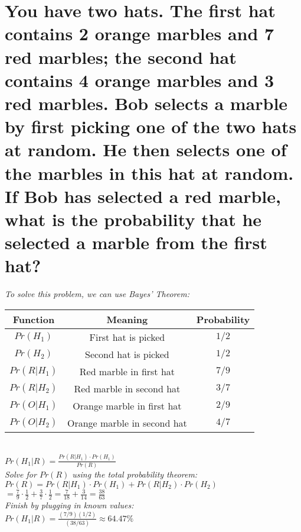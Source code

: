 \documentclass{article}
\begin{document}
\section{You have two hats. The first hat contains 2 orange marbles and 7 red marbles;
    the second hat contains 4 orange marbles and 3 red marbles. Bob selects a marble
    by first picking one of the two hats at random. He then selects one of the marbles in this hat
    at random. If Bob has selected a red marble, what is the probability that he selected a
    marble from the first hat?}
\hspace{1cm}\textit{To solve this problem, we can use Bayes' Theorem:}
\begin{center}
    \begin{tabular}{c|c|c}
        Function & Meaning & Probability \\
        \hline
        $Pr(H_1)$ & First hat is picked & $1/2$ \\
        $Pr(H_2)$ & Second hat is picked & $1/2$ \\
        \hline
        $Pr(R|H_1)$ & Red marble in first hat & $7/9$ \\
        $Pr(R|H_2)$ & Red marble in second hat & $3/7$ \\
        $Pr(O|H_1)$ & Orange marble in first hat & $2/9$ \\
        $Pr(O|H_2)$ & Orange marble in second hat & $4/7$ \\
    \end{tabular} \\
    \vspace{0.25cm}
    $Pr(H_1|R) = \frac{Pr(R|H_1)\cdot Pr(H_1)}{Pr(R)}$ \\
    \vspace{0.25cm}
    \textit{Solve for $Pr(R)$ using the total probability theorem:} \\
    \vspace{0.25cm}
    $Pr(R) = Pr(R|H_1)\cdot Pr(H_1) + Pr(R|H_2)\cdot Pr(H_2)$ \\
    \vspace{0.25cm}
    $ = \frac{7}{9}\cdot \frac{1}{2} + \frac{3}{7}\cdot \frac{1}{2} = 
    \frac{7}{18} + \frac{3}{14} = \frac{38}{63}$ \\
    \vspace{0.25cm}
    \textit{Finish by plugging in known values:} \\
    \vspace{0.25cm}
    $ Pr(H_1|R) = \frac{(7/9)(1/2)}{(38/63)} \approx 64.47\%$ \\
    \vspace{0.25cm}
\end{center}
\clearpage
\end{document}
